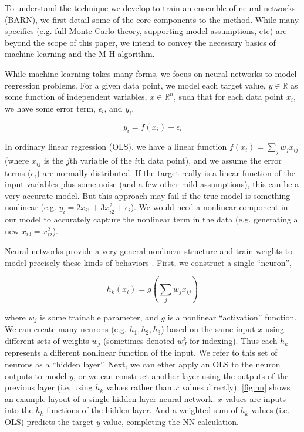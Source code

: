 \documentclass[12pt]{article}
\begin{document}
To understand the technique we develop to train an ensemble of neural networks (BARN), we first detail some of the core components to the method.  While many specifics (e.g. full Monte Carlo theory, supporting model assumptions, etc) are beyond the scope of this paper, we intend to convey the necessary basics of machine learning and the M-H algorithm.

While machine learning takes many forms, we focus on neural networks to model regression problems.  For a given data point, we model each target value, $y \in \mathbb{R}$ as some function of independent variables, $x \in \mathbb{R}^n$, such that for each data point $x_i$, we have some error term, $\epsilon_i$, and $y_i$.

$$
y_i = f(x_i) + \epsilon_i
$$

In ordinary linear regression (OLS), we have a linear function $f(x_i) = \sum_j w_j x_{ij}$ (where $x_{ij}$ is the $j$th variable of the $i$th data point), and we assume the error terms ($\epsilon_i$) are normally distributed.  If the target really is a linear function of the input variables plus some noise (and a few other mild assumptions), this can be a very accurate model.  But this approach may fail if the true model is something nonlinear (e.g. $y_i = 2x_{i1} + 3x_{i2}^2 + \epsilon_i$).  We would need a nonlinear component in our model to accurately capture the nonlinear term in the data (e.g. generating a new $x_{i3} =x_{i2}^2$).

Neural networks provide a very general nonlinear structure and train weights to model precisely these kinds of behaviors \cite{hastie2009elements}.  First, we construct a single ``neuron'',

$$
h_k(x_i) = g(\sum_j w_j x_{ij})
$$

where $w_j$ is some trainable parameter, and $g$ is a nonlinear ``activation'' function.  We can create many neurons (e.g. $h_1, h_2, h_3$) based on the same input $x$ using different sets of weights $w_j$ (sometimes denoted $w_J^k$ for indexing).  Thus each $h_k$ represents a different nonlinear function of the input.  We refer to this set of neurons as a ``hidden layer''.  Next, we can ether apply an OLS to the neuron outputs to model $y$, or we can construct another layer using the outputs of the previous layer (i.e. using $h_k$ values rather than $x$ values directly).  \autoref{fig:nn} shows an example layout of a single hidden layer neural network.  $x$ values are inputs into the $h_k$ functions of the hidden layer.  And a weighted sum of $h_k$ values  (i.e. OLS) predicts the target $y$ value, completing the NN calculation.
\end{document}
